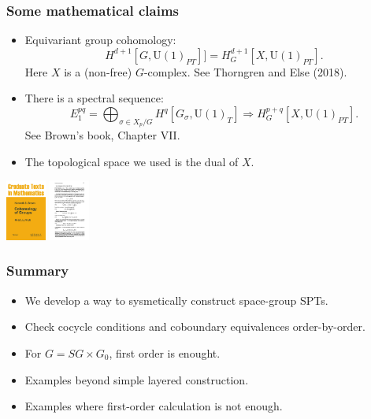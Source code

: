 \documentclass[xcolor=table, 10pt, aspectratio=43]{beamer}
\newcommand{\uone}{\mathrm U(1)}
\begin{document}
\begin{frame}
\frametitle{Some mathematical claims}
\begin{itemize}
\item Equivariant group cohomology:
\[H^{d+1}[G, \uone_{PT}]]=H^{d+1}_G[X, \uone_{PT}].\]
Here $X$ is a (non-free) $G$-complex. See Thorngren and Else (2018).
\item There is a spectral sequence:
\[E_1^{pq}=\bigoplus_{\sigma\in X_p/G}H^q[G_\sigma,\uone_T]\Rightarrow
H^{p+q}_G[X,\uone_{PT}].\]
See Brown's book, Chapter VII.
\item The topological space we used is the dual of $X$.
\end{itemize}
\begin{center}
	\includegraphics[height=2cm]{brown_book}
	\includegraphics[height=2cm]{brown_ss}
\end{center}
\end{frame}

\begin{frame}
\frametitle{Summary}
\begin{itemize}
\item We develop a way to sysmetically construct space-group SPTs.
\item Check cocycle conditions and coboundary equivalences order-by-order.
\item For $G=SG\times G_0$, first order is enought.
\item Examples beyond simple layered construction.
\item Examples where first-order calculation is not enough.
\end{itemize}
\end{frame}
\end{document}
